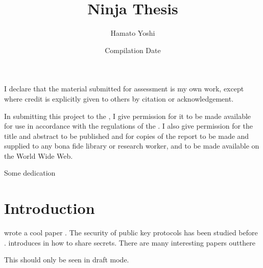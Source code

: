 \documentclass[
draft
]{sta-thesis}
\title{Ninja Thesis}
\author{Hamato Yoshi}
\date{Compilation Date}
\begin{document}
\maketitle 
\frontmatter
\thispagestyle{empty}
\begin{abstract}

\end{abstract}
\newpage
\begin{declaration}
I declare that the material submitted for assessment is my own work,
except where credit is explicitly given to others by citation or
acknowledgement.
\end{declaration}

\begin{copyrightnotice}
In submitting this project to the \emph{\theuniversity}, I give
permission for it to be made available for use in accordance with the
regulations of the \emph{\theuniversity}. I also give permission for
the title and abstract to be published and for copies of the report to
be made and supplied to any bona fide library or research worker, and
to be made available on the World Wide Web. 
\end{copyrightnotice}

\begin{dedication}
Some dedication
\end{dedication}

\tableofcontents

\mainmatter

\chapter{Introduction}
\nocite{*}
\citeauthor{Shannon1946} wrote a cool paper \citep{Shannon1946}. The security of public key protocols has been studied before \citep{Dolev1983}. \citeauthor{Shamir1979} introduces in \citet{Shamir1979} how to share secrets.
There are many interesting papers outthere \cite{Needham1978,Rivest1978,Merkle1978,Diffie1976,Shannon1949,Ziv1977, Huffman1952, Hamming1950}

\begin{fncycomment}
This should only be seen in draft mode.
\end{fncycomment}
\end{document}
